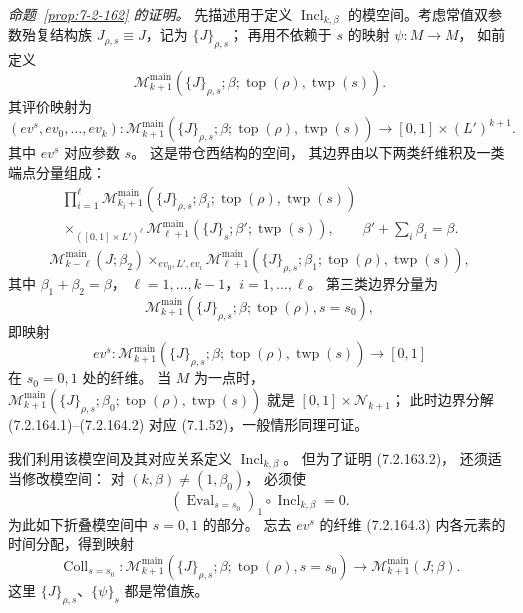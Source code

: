\par\noindent\textit{命题~\ref{prop:7-2-162} 的证明。}
先描述用于定义 $\operatorname{Incl}_{k,\beta}$
的模空间。考虑常值双参数殆复结构族
$J_{\rho,s}\equiv J$，记为 $\{J\}_{\rho,s}$；
再用不依赖于 $s$ 的映射 $\psi\colon M\to M$，
如前定义
\[
\mathcal M_{k+1}^{\mathrm{main}}
(\{J\}_{\rho,s};\beta;
\operatorname{top}(\rho),\operatorname{twp}(s)).
\]
其评价映射为
\[
(ev^s,ev_0,\ldots,ev_k)\colon
\mathcal M_{k+1}^{\mathrm{main}}
(\{J\}_{\rho,s};\beta;
\operatorname{top}(\rho),\operatorname{twp}(s))
\longrightarrow[0,1]\times(L')^{k+1}.
\]
其中 $ev^s$ 对应参数 $s$。
这是带仓西结构的空间，
其边界由以下两类纤维积及一类端点分量组成：
\begin{equation}
\begin{gathered}
\prod_{i=1}^{\ell}
\mathcal M_{k_i+1}^{\mathrm{main}}
(\{J\}_{\rho,s};\beta_i;
\operatorname{top}(\rho),\operatorname{twp}(s))
\\
\mathbin{\times_{([0,1]\times L')^\ell}}
\mathcal M_{\ell+1}^{\mathrm{main}}
(\{J\}_s;\beta';\operatorname{twp}(s)),
\qquad\beta'+\sum_i\beta_i=\beta.
\end{gathered}
\tag{7.2.164.1}\label{eq:7-2-164-1}
\end{equation}
\begin{equation}
\mathcal M_{k-\ell}^{\mathrm{main}}(J;\beta_2)
\mathbin{\times_{ev_0,L',ev_i}}
\mathcal M_{\ell+1}^{\mathrm{main}}
(\{J\}_{\rho,s};\beta_1;
\operatorname{top}(\rho),\operatorname{twp}(s)),
\tag{7.2.164.2}\label{eq:7-2-164-2}
\end{equation}
其中 $\beta_1+\beta_2=\beta$，
$\ell=1,\ldots,k-1$，$i=1,\ldots,\ell$。
第三类边界分量为
\begin{equation}
\mathcal M_{k+1}^{\mathrm{main}}
(\{J\}_{\rho,s};\beta;
\operatorname{top}(\rho),s=s_0),
\tag{7.2.164.3}\label{eq:7-2-164-3}
\end{equation}
即映射
\[
ev^s\colon
\mathcal M_{k+1}^{\mathrm{main}}
(\{J\}_{\rho,s};\beta;
\operatorname{top}(\rho),\operatorname{twp}(s))
\longrightarrow[0,1]
\]
在 $s_0=0,1$ 处的纤维。
当 $M$ 为一点时，
$\mathcal M_{k+1}^{\mathrm{main}}
(\{J\}_{\rho,s};\beta_0;
\operatorname{top}(\rho),\operatorname{twp}(s))$
就是 $[0,1]\times\mathcal N_{k+1}$；
此时边界分解 (7.2.164.1)--(7.2.164.2)
对应 (7.1.52)，一般情形同理可证。

我们利用该模空间及其对应关系定义
$\operatorname{Incl}_{k,\beta}$。
但为了证明 (7.2.163.2)，
还须适当修改模空间：
对 $(k,\beta)\ne(1,\beta_0)$，
必须使
\[
(\operatorname{Eval}_{s=s_0})_1
\circ\operatorname{Incl}_{k,\beta}=0.
\]
为此如下折叠模空间中 $s=0,1$ 的部分。
忘去 $ev^s$ 的纤维 (7.2.164.3)
内各元素的时间分配，得到映射
\[
\operatorname{Coll}_{s=s_0}\colon
\mathcal M_{k+1}^{\mathrm{main}}
(\{J\}_{\rho,s};\beta;
\operatorname{top}(\rho),s=s_0)
\longrightarrow
\mathcal M_{k+1}^{\mathrm{main}}(J;\beta).
\]
这里 $\{J\}_{\rho,s}$、$\{\psi\}_s$
都是常值族。


